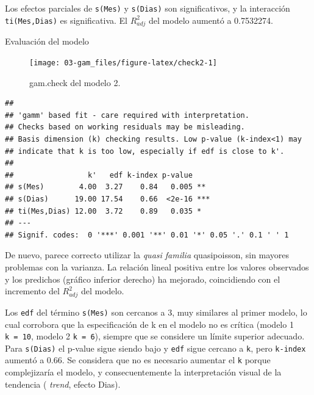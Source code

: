 \documentclass[
]{book}
\newenvironment{Shaded}{\begin{snugshade}}{\end{snugshade}}
\newcommand{\AttributeTok}[1]{\textcolor[rgb]{0.77,0.63,0.00}{#1}}
\newcommand{\DecValTok}[1]{\textcolor[rgb]{0.00,0.00,0.81}{#1}}
\newcommand{\FunctionTok}[1]{\textcolor[rgb]{0.00,0.00,0.00}{#1}}
\newcommand{\NormalTok}[1]{#1}
\newcommand{\SpecialCharTok}[1]{\textcolor[rgb]{0.00,0.00,0.00}{#1}}
\newcommand{\StringTok}[1]{\textcolor[rgb]{0.31,0.60,0.02}{#1}}
\begin{document}
Los efectos parciales de \texttt{s(Mes)} y \texttt{s(Dias)} son significativos, y la interacción \texttt{ti(Mes,Dias)} es significativa. El \(R_{adj}^{2}\) del modelo aumentó a 0.7532274.

Evaluación del modelo

\begin{Shaded}
\end{Shaded}

\begin{figure}

{\centering \texttt{[image: 03-gam\_files/figure-latex/check2-1]} 

}

\caption{gam.check del modelo 2.}\label{fig:check2}
\end{figure}

\begin{verbatim}
## 
## 'gamm' based fit - care required with interpretation.
## Checks based on working residuals may be misleading.
## Basis dimension (k) checking results. Low p-value (k-index<1) may
## indicate that k is too low, especially if edf is close to k'.
## 
##                 k'   edf k-index p-value    
## s(Mes)        4.00  3.27    0.84   0.005 ** 
## s(Dias)      19.00 17.54    0.66  <2e-16 ***
## ti(Mes,Dias) 12.00  3.72    0.89   0.035 *  
## ---
## Signif. codes:  0 '***' 0.001 '**' 0.01 '*' 0.05 '.' 0.1 ' ' 1
\end{verbatim}

De nuevo, parece correcto utilizar la \emph{quasi familia} quasipoisson, sin mayores problemas con la varianza. La relación lineal positiva entre los valores observados y los predichos (gráfico inferior derecho) ha mejorado, coincidiendo con el incremento del \(R_{adj}^{2}\) del modelo.

Los \texttt{edf} del término \texttt{s(Mes)} son cercanos a 3, muy similares al primer modelo, lo cual corrobora que la especificación de k en el modelo no es crítica (modelo 1 \texttt{k\ =\ 10}, modelo 2 \texttt{k\ =\ 6}), siempre que se considere un límite superior adecuado. Para \texttt{s(Dias)} el p-value sigue siendo bajo y \texttt{edf} sigue cercano a \texttt{k\textquotesingle{}}, pero \texttt{k-index} aumentó a 0.66. Se considera que no es necesario aumentar el \texttt{k} porque complejizaría el modelo, y consecuentemente la interpretación visual de la tendencia ( \emph{trend}, efecto Dias).
\end{document}
